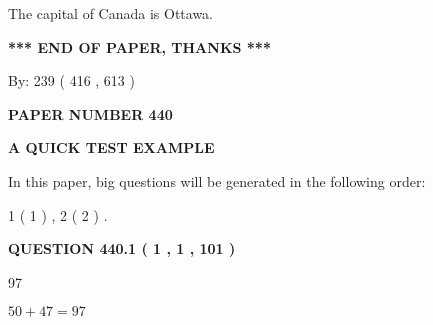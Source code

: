 \documentclass[12pt]{article}
\begin{document}
  
 
 
\noindent{}
 
 
The capital of Canada is Ottawa.
 
 
 
 
   
   
 \vspace{0.2in}
 
   
   
   
   
\vspace{1.0in} 
{\textbf{\large{ *** END OF PAPER, THANKS *** }}} 
   
   
\hspace{1.0in} By: 
 239 ( 416 ,  613 )
   
   
   
   
\newpage 
\setcounter{page}{ 
   440001 } 
   
   
   
   
 {\textbf{ \Large{ PAPER NUMBER  440  }}}
   
   
\vspace{0.2in}
   
   
   
   
   
   
 \vspace{0.2in}
{\LARGE {\textbf{ A QUICK TEST EXAMPLE}}}
   
   
   
\vspace{0.2in}
   
In this paper, big questions will be generated in the following order: 
   
   
   1 ( 1 )
 ,
   2 ( 2 )
 .
  
\vspace{0.2in}
  
{\textbf{\Large{QUESTION
440.1 
 ( 1 , 1 , 101 )
}}}
  
  
 
 
\noindent{}

97
 
 
 
 
\noindent{}

$ %
50 +  %
47=   %
97$
 
\end{document}
